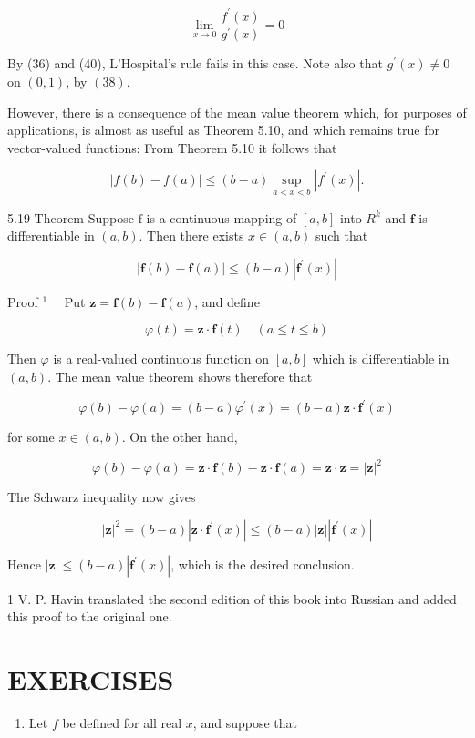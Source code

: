 \documentclass[10pt]{article}
\begin{document}
$$
\lim _{x \rightarrow 0} \frac{f^{\prime}(x)}{g^{\prime}(x)}=0
$$

By (36) and (40), L'Hospital's rule fails in this case. Note also that $g^{\prime}(x) \neq 0$ on $(0,1)$, by $(38)$.

However, there is a consequence of the mean value theorem which, for purposes of applications, is almost as useful as Theorem 5.10, and which remains true for vector-valued functions: From Theorem 5.10 it follows that

$$
|f(b)-f(a)| \leq(b-a) \sup _{a<x<b}\left|f^{\prime}(x)\right| .
$$

5.19 Theorem Suppose $\mathrm{f}$ is a continuous mapping of $[a, b]$ into $R^{k}$ and $\mathbf{f}$ is differentiable in $(a, b)$. Then there exists $x \in(a, b)$ such that

$$
|\mathbf{f}(b)-\mathbf{f}(a)| \leq(b-a)\left|\mathbf{f}^{\prime}(x)\right|
$$

Proof $^{1} \quad$ Put $\mathbf{z}=\mathbf{f}(b)-\mathbf{f}(a)$, and define

$$
\varphi(t)=\mathbf{z} \cdot \mathbf{f}(t) \quad(a \leq t \leq b)
$$

Then $\varphi$ is a real-valued continuous function on $[a, b]$ which is differentiable in $(a, b)$. The mean value theorem shows therefore that

$$
\varphi(b)-\varphi(a)=(b-a) \varphi^{\prime}(x)=(b-a) \mathbf{z} \cdot \mathbf{f}^{\prime}(x)
$$

for some $x \in(a, b)$. On the other hand,

$$
\varphi(b)-\varphi(a)=\mathbf{z} \cdot \mathbf{f}(b)-\mathbf{z} \cdot \mathbf{f}(a)=\mathbf{z} \cdot \mathbf{z}=|\mathbf{z}|^{2}
$$

The Schwarz inequality now gives

$$
|\mathbf{z}|^{2}=(b-a)\left|\mathbf{z} \cdot \mathbf{f}^{\prime}(x)\right| \leq(b-a)|\mathbf{z}|\left|\mathbf{f}^{\prime}(x)\right|
$$

Hence $|\mathbf{z}| \leq(b-a)\left|\mathbf{f}^{\prime}(x)\right|$, which is the desired conclusion.

1 V. P. Havin translated the second edition of this book into Russian and added this proof to the original one.

\section{EXERCISES}
\begin{enumerate}
  \item Let $f$ be defined for all real $x$, and suppose that
\end{enumerate}
\end{document}
